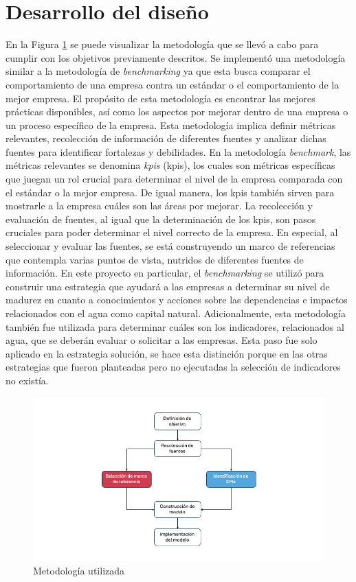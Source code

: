 \section{Desarrollo del diseño} \label{sec:desarrollo-diseno}
En la Figura \ref{fig:metodologia} se puede visualizar la metodología que se llevó a cabo para cumplir con los objetivos previamente descritos. Se implementó una metodología similar a la metodología de \textit{benchmarking} ya que esta busca comparar el comportamiento de una empresa contra un estándar o el comportamiento de la mejor empresa. El propósito de esta metodología es encontrar las mejores prácticas disponibles, así como los aspectos por mejorar dentro de una empresa o un proceso específico de la empresa. Esta metodología implica definir métricas relevantes, recolección de información de diferentes fuentes y analizar dichas fuentes para identificar fortalezas y debilidades. En la metodología \textit{benchmark}, las métricas relevantes se denomina \textit{\acrlong{kpis}} (\acrshort{kpis}), los cuales son métricas específicas que juegan un rol crucial para determinar el nivel de la empresa comparada con el estándar o la mejor empresa. De igual manera, los \acrshort{kpis} también sirven para mostrarle a la empresa cuáles son las áreas por mejorar. La recolección y evaluación de fuentes, al igual que la determinación de los \acrshort{kpis}, son pasos cruciales para poder determinar el nivel correcto de la empresa. En especial, al seleccionar y evaluar las fuentes, se está construyendo un marco de referencias que contempla varias puntos de vista, nutridos de diferentes fuentes de información. En este proyecto en particular, el \textit{benchmarking} se utilizó para construir una estrategia que ayudará a las empresas a determinar su nivel de madurez en cuanto a conocimientos y acciones sobre las dependencias e impactos relacionados con el agua como capital natural. Adicionalmente, esta metodología también fue utilizada para determinar cuáles son los indicadores, relacionados al agua,  que se deberán evaluar o solicitar a las empresas. Esta paso fue solo aplicado en la estrategia solución, se hace esta distinción porque en las otras estrategias que fueron planteadas pero no ejecutadas la selección de indicadores no existía. 

\begin{figure}[H]
    \centering
    \includegraphics[scale=0.5]{images/4-desarrollo/diagrama-metodologia.png}
    \caption{Metodología utilizada}
    \label{fig:metodologia}
\end{figure}


